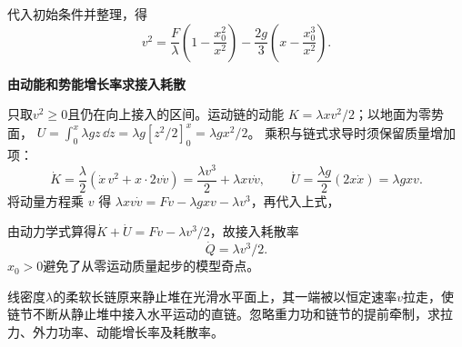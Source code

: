 \begin{solution}
代入初始条件并整理，得
\[\boxed{v^2=\frac F\lambda\left(1-\frac{x_0^2}{x^2}\right)-\frac{2g}{3}\left(x-\frac{x_0^3}{x^2}\right)}.\]


\par\medskip{}\noindent\textbf{由动能和势能增长率求接入耗散}\par\nobreak
只取$v^2\ge0$且仍在向上接入的区间。运动链的动能 $K=\lambda xv^2/2$；以地面为零势面，
$U=\int_0^x\lambda gz\,\dd z=\lambda g[z^2/2]_0^x=\lambda gx^2/2$。
乘积与链式求导时须保留质量增加项：
\[
\dot K=\frac\lambda2(\dot x\,v^2+x\cdot2v\dot v)
=\frac{\lambda v^3}{2}+\lambda xv\dot v,\qquad
\dot U=\frac{\lambda g}{2}(2x\dot x)=\lambda gxv.
\]
将动量方程乘 $v$ 得
$\lambda xv\dot v=Fv-\lambda gxv-\lambda v^3$，再代入上式，

由动力学式算得$\dot K+\dot U=Fv-\lambda v^3/2$，故接入耗散率
\[\boxed{\dot Q=\lambda v^3/2}.\]
$x_0>0$避免了从零运动质量起步的模型奇点。\end{solution}
\begin{question}\begin{example}[匀速收拢水平链条的功率]\label{em1:example:15}
线密度$\lambda$的柔软长链原来静止堆在光滑水平面上，其一端被以恒定速率$v$拉走，使链节不断从静止堆中接入水平运动的直链。忽略重力功和链节的提前牵制，求拉力、外力功率、动能增长率及耗散率。
\end{example}
\end{question}
